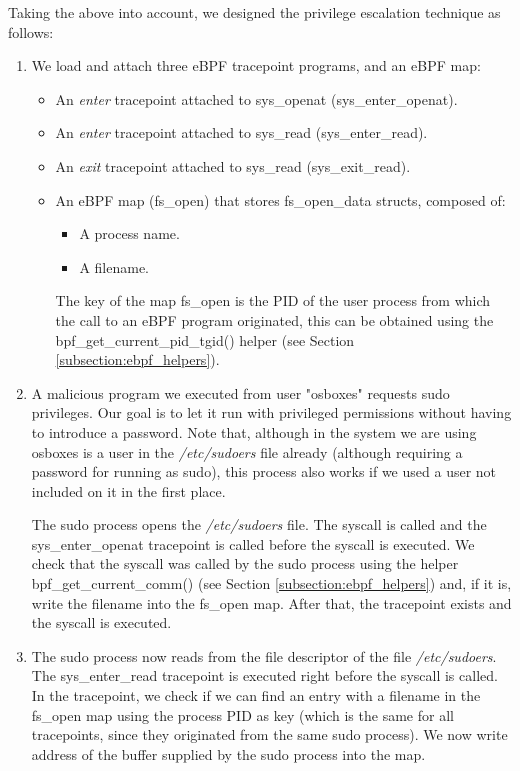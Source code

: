 Taking the above into account, we designed the privilege escalation technique as follows:
\begin{enumerate}
\item We load and attach three eBPF tracepoint programs, and an eBPF map:
\begin{itemize}
	\item An \textit{enter} tracepoint attached to sys\_openat (sys\_enter\_openat).
	\item An \textit{enter} tracepoint attached to sys\_read (sys\_enter\_read).
	\item An \textit{exit} tracepoint attached to sys\_read (sys\_exit\_read).
	\item An eBPF map (fs\_open) that stores fs\_open\_data structs, composed of:
	\begin{itemize}
	\item A process name.
	\item A filename.
	\end{itemize}
	The key of the map fs\_open is the PID of the user process from which the call to an eBPF program originated, this can be obtained using the bpf\_get\_current\_pid\_tgid() helper (see Section \ref{subsection:ebpf_helpers}).
\end{itemize}
\item A malicious program we executed from user "osboxes" requests sudo privileges. Our goal is to let it run with privileged permissions without having to introduce a password. Note that, although in the system we are using osboxes is a user in the \textit{/etc/sudoers} file already (although requiring a password for running as sudo), this process also works if we used a user not included on it in the first place.

The sudo process opens the \textit{/etc/sudoers} file. The syscall is called and the sys\_enter\_openat tracepoint is called before the syscall is executed. We check that the syscall was called by the sudo process using the helper bpf\_get\_current\_comm() (see Section \ref{subsection:ebpf_helpers}) and, if it is, write the filename into the fs\_open map. After that, the tracepoint exists and the syscall is executed.

\item The sudo process now reads from the file descriptor of the file \textit{/etc/sudoers}. The sys\_enter\_read tracepoint is executed right before the syscall is called. In the tracepoint, we check if we can find an entry with a filename in the fs\_open map using the process PID as key (which is the same for all tracepoints, since they originated from the same sudo process). We now write address of the buffer supplied by the sudo process into the map.


\end{enumerate}
